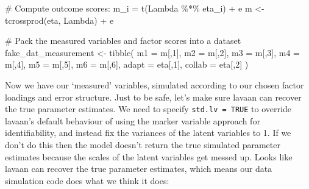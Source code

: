 \documentclass[
  letterpaper,
  DIV=11,
  numbers=noendperiod]{scrreprt}
\newenvironment{Shaded}{\begin{snugshade}}{\end{snugshade}}
\newcommand{\AttributeTok}[1]{\textcolor[rgb]{0.40,0.45,0.13}{#1}}
\newcommand{\CommentTok}[1]{\textcolor[rgb]{0.37,0.37,0.37}{#1}}
\newcommand{\DecValTok}[1]{\textcolor[rgb]{0.68,0.00,0.00}{#1}}
\newcommand{\FunctionTok}[1]{\textcolor[rgb]{0.28,0.35,0.67}{#1}}
\newcommand{\NormalTok}[1]{\textcolor[rgb]{0.00,0.23,0.31}{#1}}
\newcommand{\OtherTok}[1]{\textcolor[rgb]{0.00,0.23,0.31}{#1}}
\newcommand{\SpecialCharTok}[1]{\textcolor[rgb]{0.37,0.37,0.37}{#1}}
\begin{document}
\begin{Shaded}
\begin{Highlighting}[]
\CommentTok{\# Compute outcome scores: m\_i = t(Lambda \%*\% eta\_i) + e}
\NormalTok{m }\OtherTok{\textless{}{-}} \FunctionTok{tcrossprod}\NormalTok{(eta, Lambda) }\SpecialCharTok{+}\NormalTok{ e}

\CommentTok{\# Pack the measured variables and factor scores into a dataset}
\NormalTok{fake\_dat\_measurement }\OtherTok{\textless{}{-}} \FunctionTok{tibble}\NormalTok{(}
  \AttributeTok{m1 =}\NormalTok{ m[,}\DecValTok{1}\NormalTok{],}
  \AttributeTok{m2 =}\NormalTok{ m[,}\DecValTok{2}\NormalTok{],}
  \AttributeTok{m3 =}\NormalTok{ m[,}\DecValTok{3}\NormalTok{],}
  \AttributeTok{m4 =}\NormalTok{ m[,}\DecValTok{4}\NormalTok{],}
  \AttributeTok{m5 =}\NormalTok{ m[,}\DecValTok{5}\NormalTok{],}
  \AttributeTok{m6 =}\NormalTok{ m[,}\DecValTok{6}\NormalTok{],}
  \AttributeTok{adapt =}\NormalTok{ eta[,}\DecValTok{1}\NormalTok{],}
  \AttributeTok{collab =}\NormalTok{ eta[,}\DecValTok{2}\NormalTok{]}
\NormalTok{)}
\end{Highlighting}
\end{Shaded}

Now we have our `measured' variables, simulated according to our chosen
factor loadings and error structure. Just to be safe, let's make sure
lavaan can recover the true parameter estimates. We need to specify
\texttt{std.lv\ =\ TRUE} to override lavaan's default behaviour of using
the marker variable approach for identifiability, and instead fix the
variances of the latent variables to 1. If we don't do this then the
model doesn't return the true simulated parameter estimates because the
scales of the latent variables get messed up. Looks like lavaan can
recover the true parameter estimates, which means our data simulation
code does what we think it does:
\end{document}
